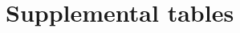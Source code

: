 \documentclass[a4paper,11pt,abstracton,hidelinks]{scrartcl}
\begin{document}
%
%
%
%
%
%
%
%
%
%


\clearpage

\section{Supplemental tables}


\clearpage
\end{document}
